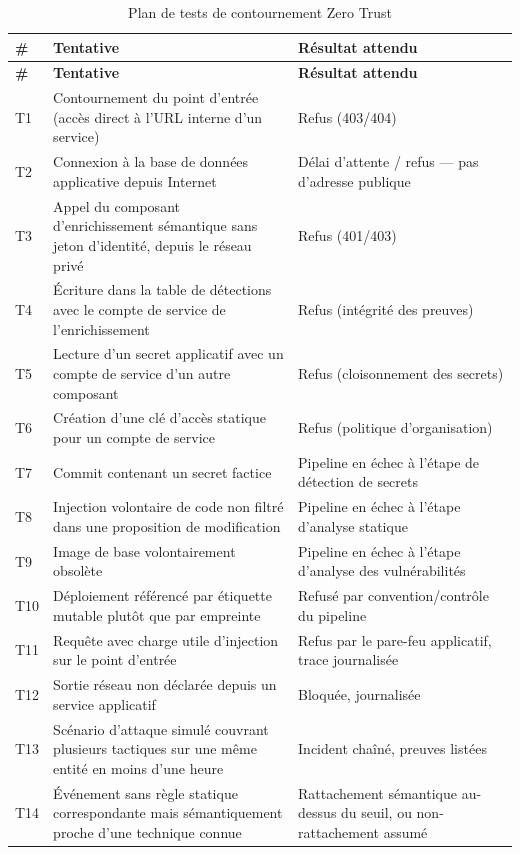 \begin{longtable}{@{}P{1cm}P{6.2cm}P{6.8cm}@{}}
\caption{Plan de tests de contournement Zero Trust}
\label{tab:plan-tests} \\
\toprule
\textbf{\#} & \textbf{Tentative} & \textbf{Résultat attendu} \\
\midrule
\endfirsthead
\toprule
\textbf{\#} & \textbf{Tentative} & \textbf{Résultat attendu} \\
\midrule
\endhead
T1 & Contournement du point d'entrée (accès direct à l'URL interne d'un service) & Refus
(403/404) \\
T2 & Connexion à la base de données applicative depuis Internet & Délai d'attente / refus ---
pas d'adresse publique \\
T3 & Appel du composant d'enrichissement sémantique sans jeton d'identité, depuis le réseau
privé & Refus (401/403) \\
T4 & Écriture dans la table de détections avec le compte de service de l'enrichissement &
Refus (intégrité des preuves) \\
T5 & Lecture d'un secret applicatif avec un compte de service d'un autre composant & Refus
(cloisonnement des secrets) \\
T6 & Création d'une clé d'accès statique pour un compte de service & Refus (politique
d'organisation) \\
T7 & Commit contenant un secret factice & Pipeline en échec à l'étape de détection de
secrets \\
T8 & Injection volontaire de code non filtré dans une proposition de modification & Pipeline
en échec à l'étape d'analyse statique \\
T9 & Image de base volontairement obsolète & Pipeline en échec à l'étape d'analyse des
vulnérabilités \\
T10 & Déploiement référencé par étiquette mutable plutôt que par empreinte & Refusé par
convention/contrôle du pipeline \\
T11 & Requête avec charge utile d'injection sur le point d'entrée & Refus par le pare-feu
applicatif, trace journalisée \\
T12 & Sortie réseau non déclarée depuis un service applicatif & Bloquée, journalisée \\
T13 & Scénario d'attaque simulé couvrant plusieurs tactiques sur une même entité en moins
d'une heure & Incident chaîné, preuves listées \\
T14 & Événement sans règle statique correspondante mais sémantiquement proche d'une
technique connue & Rattachement sémantique au-dessus du seuil, ou non-rattachement assumé \\

\end{longtable}

